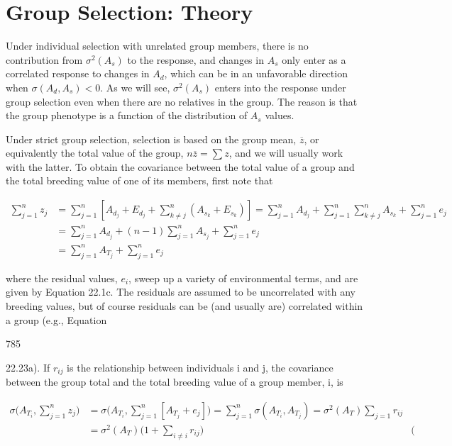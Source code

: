 \documentclass{article}
\begin{document}
\section{Group Selection: Theory}
Under individual selection with unrelated group members, there is no contribution from  $ \sigma^2(A_s) $ to the response, and changes in  $ A_s $ only enter as a correlated response to changes in  $ A_d $, which can be in an unfavorable direction when  $ \sigma(A_d, A_s) < 0 $. As we will see,  $ \sigma^2(A_s) $ enters into the response under group selection even when there are no relatives in the group. The reason is that the group phenotype is a function of the distribution of  $ A_s $ values.

Under strict group selection, selection is based on the group mean,  $ \overline{z} $, or equivalently the total value of the group,  $ n\overline{z} = \sum z $, and we will usually work with the latter. To obtain the covariance between the total value of a group and the total breeding value of one of its members, first note that

\begin{equation}
\begin{aligned}\sum_{j=1}^{n}z_{j}&=\sum_{j=1}^{n}\left[A_{d_{j}}+E_{d_{j}}+\sum_{k\neq j}^{n}\left(A_{s_{k}}+E_{s_{k}}\right)\right]=\sum_{j=1}^{n}A_{d_{j}}+\sum_{j=1}^{n}\sum_{k\neq j}^{n}A_{s_{k}}+\sum_{j=1}^{n}e_{j}\\&=\sum_{j=1}^{n}A_{d_{j}}+(n-1)\sum_{j=1}^{n}A_{s_{j}}+\sum_{j=1}^{n}e_{j}\\&=\sum_{j=1}^{n}A_{T_{j}}+\sum_{j=1}^{n}e_{j}\end{aligned}
\tag{22.18}
\label{eq:22_18}
\end{equation}

where the residual values,  $ e_{i} $, sweep up a variety of environmental terms, and are given by Equation 22.1c. The residuals are assumed to be uncorrelated with any breeding values, but of course residuals can be (and usually are) correlated within a group (e.g., Equation

785

22.23a). If  $ r_{ij} $ is the relationship between individuals i and j, the covariance between the group total and the total breeding value of a group member, i, is

\begin{equation}
\begin{align*}\sigma\bigg(A_{T_{i}},\sum_{j=1}^{n}z_{j}\bigg)&=\sigma\bigg(A_{T_{i}},\sum_{j=1}^{n}[A_{T_{j}}+e_{j}]\bigg)=\sum_{j=1}^{n}\sigma\left(A_{T_{i}},A_{T_{j}}\right)=\sigma^{2}(A_{T})\sum_{j=1}r_{ij}\\&=\sigma^{2}(A_{T})\bigg(1+\sum_{i\neq i}r_{ij}\bigg)\quad&(\end{align*}
\tag{22.19a}
\label{eq:22_19a}
\end{equation}
\end{document}

